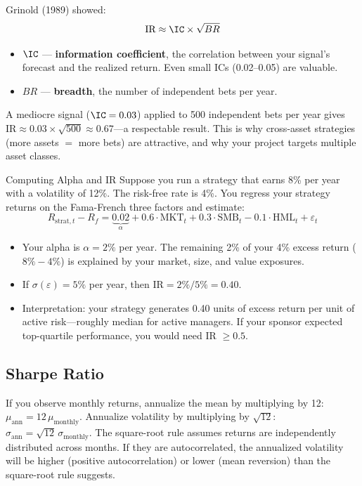 \begin{keyidea}
Grinold (1989) showed:
\begin{equation}
\text{IR} \approx \IC \times \sqrt{BR}
\label{eq:fundamental-law}
\end{equation}
\begin{itemize}[nosep]
  \item $\IC$ --- \textbf{information coefficient}, the correlation between your signal's forecast and the realized return. Even small ICs (0.02--0.05) are valuable.
  \item $BR$ --- \textbf{breadth}, the number of independent bets per year.
\end{itemize}
A mediocre signal ($\IC = 0.03$) applied to 500 independent bets per year gives $\text{IR} \approx 0.03 \times \sqrt{500} \approx 0.67$---a respectable result. This is why cross-asset strategies (more assets $=$ more bets) are attractive, and why your project targets multiple asset classes.
\end{keyidea}

\begin{workedexample}{Computing Alpha and IR}
Suppose you run a strategy that earns 8\% per year with a volatility of 12\%. The risk-free rate is 4\%. You regress your strategy returns on the Fama-French three factors and estimate:
\[
R_{\text{strat},t} - R_f = \underbrace{0.02}_{\alpha} + 0.6 \cdot \text{MKT}_t + 0.3 \cdot \text{SMB}_t - 0.1 \cdot \text{HML}_t + \varepsilon_t
\]
\begin{itemize}[nosep]
  \item Your alpha is $\alpha = 2\%$ per year. The remaining 2\% of your 4\% excess return ($8\% - 4\%$) is explained by your market, size, and value exposures.
  \item If $\sigma(\varepsilon) = 5\%$ per year, then $\text{IR} = 2\%/5\% = 0.40$.
  \item Interpretation: your strategy generates 0.40 units of excess return per unit of active risk---roughly median for active managers. If your sponsor expected top-quartile performance, you would need IR $\geq 0.5$.
\end{itemize}
\end{workedexample}

\subsection{Sharpe Ratio}

\begin{prereq}
If you observe monthly returns, annualize the mean by multiplying by 12: $\mu_{\text{ann}} = 12 \, \mu_{\text{monthly}}$. Annualize volatility by multiplying by $\sqrt{12}$: $\sigma_{\text{ann}} = \sqrt{12} \, \sigma_{\text{monthly}}$. The square-root rule assumes returns are independently distributed across months. If they are autocorrelated, the annualized volatility will be higher (positive autocorrelation) or lower (mean reversion) than the square-root rule suggests.
\end{prereq}

